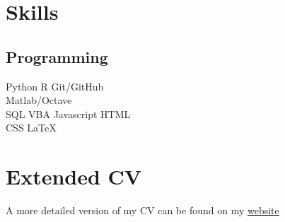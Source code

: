 \documentclass[]{cv-template}
\begin{document}
\begin{minipage}[t]{0.33\textwidth}

\section{Skills}
\subsection{Programming}
Python \textbullet{} R \textbullet{} Git/GitHub \\
Matlab/Octave\\ 
SQL \textbullet{} VBA \textbullet{} Javascript \textbullet{} HTML \\
CSS \textbullet{} \LaTeX\
\sectionsep



\section{Extended CV}
A more detailed version of my CV can be found on my \href{http://www.jackgrimes.uk/bio/}{website}\\

%
%

\end{minipage} 
\hfill
\end{document}

